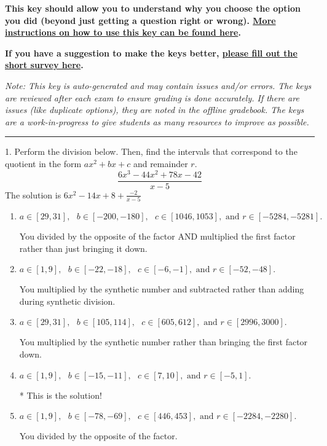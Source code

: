 \documentclass{extbook}[14pt]
\begin{document}
\textbf{This key should allow you to understand why you choose the option you did (beyond just getting a question right or wrong). \href{https://xronos.clas.ufl.edu/mac1105spring2020/courseDescriptionAndMisc/Exams/LearningFromResults}{More instructions on how to use this key can be found here}.}

\textbf{If you have a suggestion to make the keys better, \href{https://forms.gle/CZkbZmPbC9XALEE88}{please fill out the short survey here}.}

\textit{Note: This key is auto-generated and may contain issues and/or errors. The keys are reviewed after each exam to ensure grading is done accurately. If there are issues (like duplicate options), they are noted in the offline gradebook. The keys are a work-in-progress to give students as many resources to improve as possible.}

\rule{\textwidth}{0.4pt}

1. Perform the division below. Then, find the intervals that correspond to the quotient in the form $ax^2+bx+c$ and remainder $r$.
\[ \frac{6x^{3} -44 x^{2} +78 x -42}{x -5} \] 
The solution is $ 6x^{2} -14 x + 8 + \frac{-2}{x -5} $ 

\begin{enumerate}[label=\Alph*.] 
\item $ a \in [29, 31], \text{   } b \in [-200, -180], \text{   } c \in [1046, 1053], \text{   and   } r \in [-5284, -5281]. $ 

  You divided by the opposite of the factor AND multiplied the first factor rather than just bringing it down. 
\item $ a \in [1, 9], \text{   } b \in [-22, -18], \text{   } c \in [-6, -1], \text{   and   } r \in [-52, -48]. $ 

  You multiplied by the synthetic number and subtracted rather than adding during synthetic division. 
\item $ a \in [29, 31], \text{   } b \in [105, 114], \text{   } c \in [605, 612], \text{   and   } r \in [2996, 3000]. $ 

  You multiplied by the synthetic number rather than bringing the first factor down. 
\item $ a \in [1, 9], \text{   } b \in [-15, -11], \text{   } c \in [7, 10], \text{   and   } r \in [-5, 1]. $ 

 * This is the solution! 
\item $ a \in [1, 9], \text{   } b \in [-78, -69], \text{   } c \in [446, 453], \text{   and   } r \in [-2284, -2280]. $ 

  You divided by the opposite of the factor. 
\end{enumerate} 
 
\end{document}
